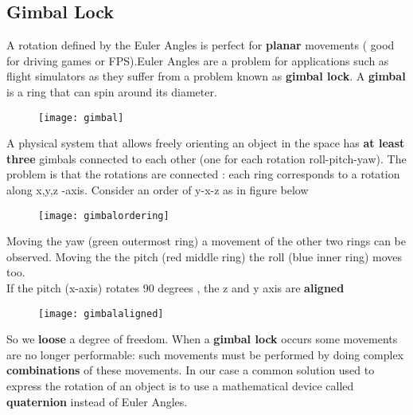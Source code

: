 \subsection{Gimbal Lock}
A rotation defined by the Euler Angles is perfect for \textbf{planar} movements ( good for driving games or FPS).Euler Angles are a problem for applications such as flight simulators as they suffer from a problem known as \textbf{gimbal lock}.
A \textbf{gimbal} is a ring that can spin around its diameter.
\begin{figure}[H]
  \centering
  \texttt{[image: gimbal]}
\end{figure}
A physical system that allows freely orienting an object in the space has \textbf{at least three} gimbals connected to each other (one for each rotation roll-pitch-yaw).
The problem is that the rotations are connected : each ring corresponds to a rotation along x,y,z -axis. Consider an order of y-x-z as in figure below
\begin{figure}[H]
  \centering
  \texttt{[image: gimbalordering]}
\end{figure}
Moving the yaw (green outermost ring) a movement of the other two rings can be observed. Moving the the pitch (red middle ring) the roll (blue inner ring) moves too.\\
If the pitch (x-axis) rotates 90 degrees , the z and y axis are \textbf{aligned}
\begin{figure}[H]
  \centering
  \texttt{[image: gimbalaligned]}
\end{figure}
So we \textbf{loose} a degree of freedom. When a \textbf{gimbal lock} occurs some movements are no longer performable: such movements must be performed by doing complex \textbf{combinations} of these movements. In our case a common solution used to express the rotation of an object is to use a mathematical device called \textbf{quaternion} instead of Euler Angles.